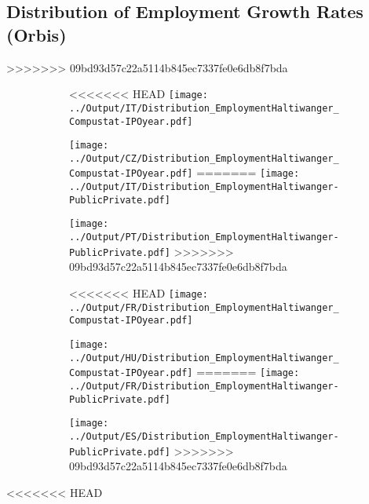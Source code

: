 \documentclass[12pt,notitlepage]{article}
\begin{document}
\subsection{Distribution of Employment Growth Rates (Orbis)}
>>>>>>> 09bd93d57c22a5114b845ec7337fe0e6db8f7bda
\begin{figure}[!htpb]
\centering
\begin{subfigure}{.49\textwidth}
    \centering
<<<<<<< HEAD
 \texttt{[image: ../Output/IT/Distribution\_EmploymentHaltiwanger\_Compustat-IPOyear.pdf]}
\end{subfigure}%
\begin{subfigure}{.49\textwidth}
    \centering
 \texttt{[image: ../Output/CZ/Distribution\_EmploymentHaltiwanger\_Compustat-IPOyear.pdf]}
=======
 \texttt{[image: ../Output/IT/Distribution\_EmploymentHaltiwanger-PublicPrivate.pdf]}
\end{subfigure}%
\begin{subfigure}{.49\textwidth}
    \centering
 \texttt{[image: ../Output/PT/Distribution\_EmploymentHaltiwanger-PublicPrivate.pdf]}
>>>>>>> 09bd93d57c22a5114b845ec7337fe0e6db8f7bda
\end{subfigure}
\begin{subfigure}{.49\textwidth}
    \centering
<<<<<<< HEAD
 \texttt{[image: ../Output/FR/Distribution\_EmploymentHaltiwanger\_Compustat-IPOyear.pdf]}
\end{subfigure}%
\begin{subfigure}{.49\textwidth}
    \centering
 \texttt{[image: ../Output/HU/Distribution\_EmploymentHaltiwanger\_Compustat-IPOyear.pdf]}
=======
 \texttt{[image: ../Output/FR/Distribution\_EmploymentHaltiwanger-PublicPrivate.pdf]}
\end{subfigure}%
\begin{subfigure}{.49\textwidth}
    \centering
 \texttt{[image: ../Output/ES/Distribution\_EmploymentHaltiwanger-PublicPrivate.pdf]}
>>>>>>> 09bd93d57c22a5114b845ec7337fe0e6db8f7bda
\end{subfigure}
\end{figure}

<<<<<<< HEAD
\end{document}
